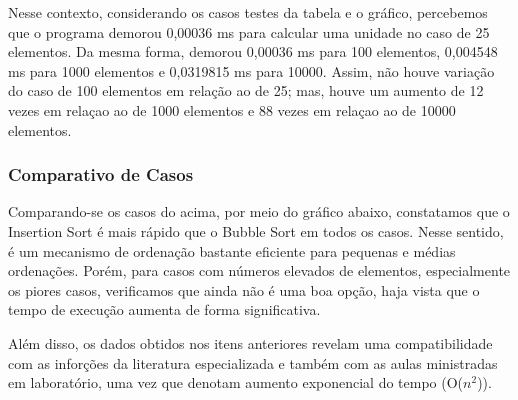 \documentclass[a4paper, 12pt]{article}
\begin{document}
\vspace{0.8cm}
Nesse contexto, considerando os casos testes da tabela e o gráfico, percebemos que o programa demorou 0,00036 ms para calcular uma unidade no caso de 25 elementos. Da mesma forma, demorou 0,00036 ms para 100 elementos, 0,004548 ms para 1000 elementos e 0,0319815 ms para 10000. Assim, não houve variação do caso de 100 elementos em relação ao de 25; mas, houve um aumento de 12 vezes em relaçao ao de 1000 elementos e 88 vezes em relaçao ao de 10000 elementos.

\subsubsection{Comparativo de Casos}

Comparando-se os casos do acima, por meio do gráfico abaixo, constatamos que o Insertion Sort é mais rápido que o Bubble Sort em todos os casos. Nesse sentido, é um mecanismo de ordenação bastante eficiente para pequenas e médias ordenações. Porém, para casos com números elevados de elementos, especialmente os piores casos, verificamos que ainda não é uma boa opção, haja vista que o tempo de execução aumenta de forma significativa.

\begin{center}
\end{center}


\vspace{0.8cm}
Além disso, os dados obtidos nos itens anteriores revelam uma compatibilidade com as inforções da literatura especializada e também com as aulas ministradas em laboratório, uma vez que denotam aumento exponencial do tempo (O($n^2$)).
\end{document}
